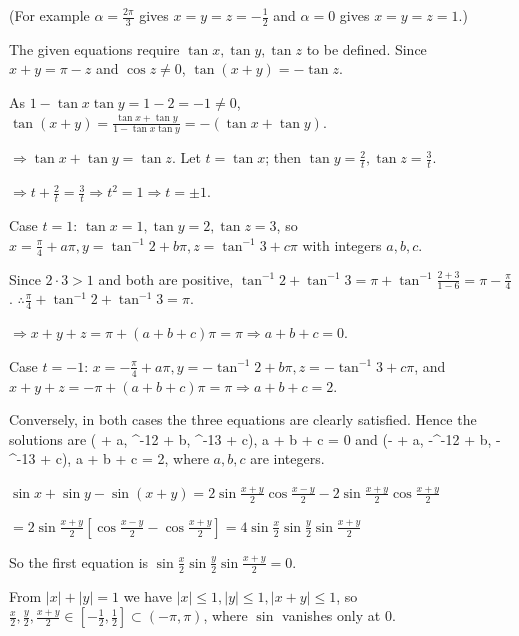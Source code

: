   (For example $\alpha = \frac{2\pi}{3}$ gives $x = y = z = -\frac{1}{2}$ and $\alpha = 0$ gives $x = y = z =
  1$.)
\item The given equations require $\tan x, \tan y, \tan z$ to be defined. Since $x + y = \pi - z$ and $\cos z
  \neq 0$, $\tan(x + y) = -\tan z$.

  As $1 - \tan x\tan y = 1 - 2 = -1\neq 0$, $\tan(x + y) = \frac{\tan x + \tan y}{1 - \tan x\tan y} = -(\tan x +
  \tan y)$.

  $\Rightarrow\tan x + \tan y = \tan z$. Let $t = \tan x$; then $\tan y = \frac{2}{t}, \tan z = \frac{3}{t}$.

  $\Rightarrow t + \frac{2}{t} = \frac{3}{t}\Rightarrow t^2 = 1\Rightarrow t = \pm1$.

  Case $t = 1$: $\tan x = 1, \tan y = 2, \tan z = 3$, so $x = \frac{\pi}{4} + a\pi, y = \tan^{-1}2 + b\pi, z =
  \tan^{-1}3 + c\pi$ with integers $a, b, c$.

  Since $2\cdot3 > 1$ and both are positive, $\tan^{-1}2 + \tan^{-1}3 = \pi + \tan^{-1}\frac{2 + 3}{1 - 6} = \pi
  - \frac{\pi}{4}$. $\therefore\frac{\pi}{4} + \tan^{-1}2 + \tan^{-1}3 = \pi$.

  $\Rightarrow x + y + z = \pi + (a + b + c)\pi = \pi\Rightarrow a + b + c = 0$.

  Case $t = -1$: $x = -\frac{\pi}{4} + a\pi, y = -\tan^{-1}2 + b\pi, z = -\tan^{-1}3 + c\pi$, and $x + y + z =
  -\pi + (a + b + c)\pi = \pi\Rightarrow a + b + c = 2$.

  Conversely, in both cases the three equations are clearly satisfied. Hence the solutions are
  \startformula
    \left( + a\pi, \tan^{-1}2 + b\pi, \tan^{-1}3 + c\pi\right), a + b + c = 0
  \stopformula
  and
  \startformula
    \left(- + a\pi, -\tan^{-1}2 + b\pi, -\tan^{-1}3 + c\pi\right), a + b + c = 2,
  \stopformula
  where $a, b, c$ are integers.
\item $\sin x + \sin y - \sin(x + y) = 2\sin\frac{x + y}{2}\cos\frac{x - y}{2} - 2\sin\frac{x +
  y}{2}\cos\frac{x + y}{2}$

  $= 2\sin\frac{x + y}{2}\left[\cos\frac{x - y}{2} - \cos\frac{x + y}{2}\right] = 4\sin\frac{x}{2}\sin\frac{y}{2}
  \sin\frac{x + y}{2}$

  So the first equation is $\sin\frac{x}{2}\sin\frac{y}{2}\sin\frac{x + y}{2} = 0$.

  From $|x| + |y| = 1$ we have $|x|\le 1, |y|\le 1, |x + y|\le 1$, so $\frac{x}{2}, \frac{y}{2}, \frac{x +
  y}{2}\in\left[-\frac{1}{2}, \frac{1}{2}\right]\subset(-\pi, \pi)$, where $\sin$ vanishes only at $0$.

